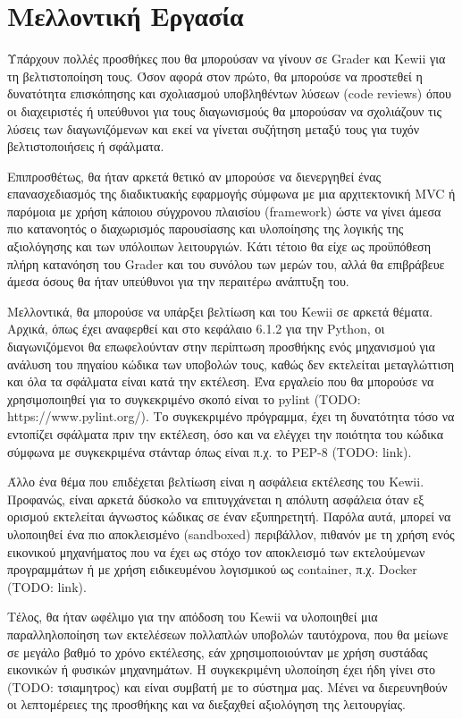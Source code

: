 \documentclass[diploma]{softlab-thesis}
\begin{document}
\section{Μελλοντική Εργασία}

Υπάρχουν πολλές προσθήκες που θα μπορούσαν να γίνουν σε Grader και Kewii για τη
βελτιστοποίηση τους. Όσον αφορά στον πρώτο, θα μπορούσε να προστεθεί η δυνατότητα
επισκόπησης και σχολιασμού υποβληθέντων λύσεων (code reviews) όπου οι διαχειριστές
ή υπεύθυνοι για τους διαγωνισμούς θα μπορούσαν να σχολιάζουν τις λύσεις των
διαγωνιζόμενων και εκεί να γίνεται συζήτηση μεταξύ τους για τυχόν βελτιστοποιήσεις
ή σφάλματα.

\bigskip

Επιπροσθέτως, θα ήταν αρκετά θετικό αν μπορούσε να διενεργηθεί ένας επανασχεδιασμός
της διαδικτυακής εφαρμογής σύμφωνα με μια αρχιτεκτονική MVC ή παρόμοια με χρήση
κάποιου σύγχρονου πλαισίου (framework) ώστε να γίνει άμεσα πιο κατανοητός ο
διαχωρισμός παρουσίασης και υλοποίησης της λογικής της αξιολόγησης και των
υπόλοιπων λειτουργιών. Κάτι τέτοιο θα είχε ως προϋπόθεση πλήρη κατανόηση του Grader
και του συνόλου των μερών του, αλλά θα επιβράβευε άμεσα όσους θα ήταν υπεύθυνοι για
την περαιτέρω ανάπτυξη του.

\bigskip

Μελλοντικά, θα μπορούσε να υπάρξει βελτίωση και του Kewii σε αρκετά θέματα.
Αρχικά, όπως έχει αναφερθεί και στο κεφάλαιο 6.1.2 για την Python, οι
διαγωνιζόμενοι θα επωφελούνταν στην περίπτωση προσθήκης ενός μηχανισμού για
ανάλυση του πηγαίου κώδικα των υποβολών τους, καθώς δεν εκτελείται μεταγλώττιση
και όλα τα σφάλματα είναι κατά την εκτέλεση. Ένα εργαλείο που θα μπορούσε να
χρησιμοποιηθεί για το συγκεκριμένο σκοπό είναι το pylint (TODO:
https://www.pylint.org/). Το συγκεκριμένο πρόγραμμα, έχει τη δυνατότητα τόσο να
εντοπίζει σφάλματα πριν την εκτέλεση, όσο και να ελέγχει την ποιότητα του
κώδικα σύμφωνα με συγκεκριμένα στάνταρ όπως είναι π.χ. το PEP-8 (TODO: link).

\bigskip

Άλλο ένα θέμα που επιδέχεται βελτίωση είναι η ασφάλεια εκτέλεσης του Kewii.
Προφανώς, είναι αρκετά δύσκολο να επιτυγχάνεται η απόλυτη ασφάλεια όταν εξ ορισμού
εκτελείται άγνωστος κώδικας σε έναν εξυπηρετητή. Παρόλα αυτά, μπορεί να υλοποιηθεί
ένα πιο αποκλεισμένο (sandboxed) περιβάλλον, πιθανόν με τη χρήση ενός εικονικού
μηχανήματος που να έχει ως στόχο τον αποκλεισμό των εκτελούμενων προγραμμάτων ή
με χρήση ειδικευμένου λογισμικού ως container, π.χ. Docker (TODO: link).

\bigskip

Τέλος, θα ήταν ωφέλιμο για την απόδοση του Kewii να υλοποιηθεί μια παραλληλοποίηση
των εκτελέσεων πολλαπλών υποβολών ταυτόχρονα, που θα μείωνε σε μεγάλο βαθμό το
χρόνο εκτέλεσης, εάν χρησιμοποιούνταν με χρήση συστάδας εικονικών ή φυσικών
μηχανημάτων. Η συγκεκριμένη υλοποίηση έχει ήδη γίνει στο (TODO: τσιαμητρος) και
είναι συμβατή με το σύστημα μας. Μένει να διερευνηθούν οι λεπτομέρειες της
προσθήκης και να διεξαχθεί αξιολόγηση της λειτουργίας.




\end{document}
